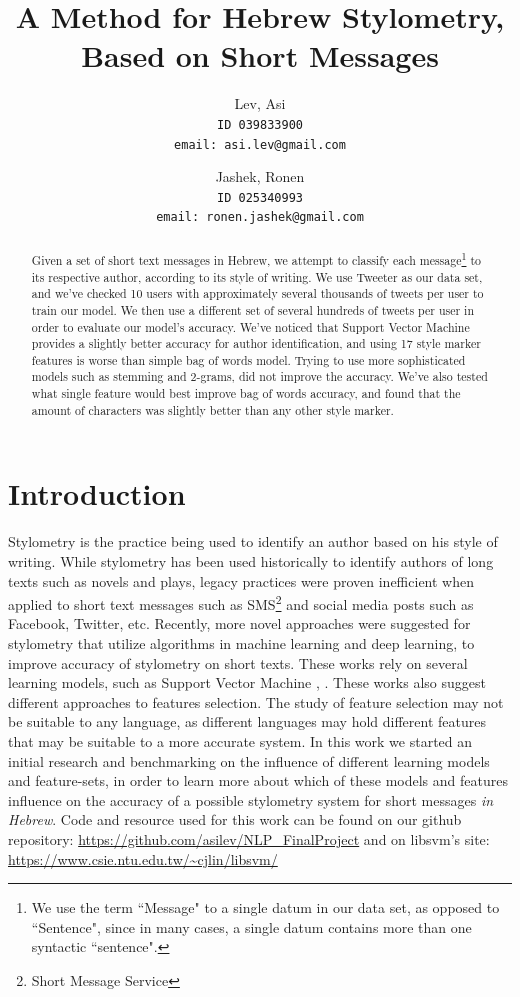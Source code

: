 \documentclass[a4paper]{article}
\author{Lev, Asi\\
	\texttt{ID 039833900}\\
	\texttt{email: asi.lev@gmail.com}
\and
	Jashek, Ronen\\
	\texttt{ID 025340993}\\
	\texttt{email: ronen.jashek@gmail.com}	
}
\title{A Method for Hebrew Stylometry, Based on Short Messages}
\date{}
\begin{document}
\maketitle
\begin{abstract}

Given a set of short text messages in Hebrew, we attempt to classify each message\footnote{We use the term ``Message" to a single datum in our data set, as opposed to ``Sentence", since in many cases, a single datum contains more than one syntactic ``sentence".} to its respective author, according to its style of writing.
We use Tweeter as our data set, and we've checked 10 users with approximately several thousands of tweets per user to train our model.
We then use a different set of several hundreds of tweets per user in order to evaluate our model's accuracy.
We've noticed that Support Vector Machine provides a slightly better accuracy for author identification, and using 17 style marker features is worse than simple bag of words model. Trying to use more sophisticated models such as stemming and 2-grams, did not improve the accuracy. We've also tested what single feature would best improve bag of words accuracy, and found that the amount of characters was slightly better than any other style marker.
\end{abstract}
\section{Introduction}

Stylometry is the practice being used to identify an author based on his style of writing.
While stylometry has been used historically to identify authors of long texts such as novels and plays, legacy practices were proven inefficient when applied to short text messages such as SMS\footnote{Short Message Service} and social media posts such as Facebook, Twitter, etc. \cite{rachel}
Recently, more novel approaches were suggested for stylometry that utilize algorithms in machine learning and deep learning, to improve accuracy of stylometry on short texts.
These works rely on several learning models, such as Support Vector Machine \cite{rachel}, \cite{schwartz}.
These works also suggest different approaches to features selection. The study of feature selection may not be suitable to any language, as different languages may hold different features that may be suitable to a more accurate system.
In this work we started an initial research and benchmarking on the influence of different learning models and feature-sets, in order to learn more about which of these models and features influence on the accuracy of a possible stylometry system for short messages \emph{in Hebrew}.
Code and resource used for this work can be found on our github repository: \url{https://github.com/asilev/NLP\_FinalProject} and on libsvm's site: \url{https://www.csie.ntu.edu.tw/~cjlin/libsvm/} \cite{chang}
\end{document}
